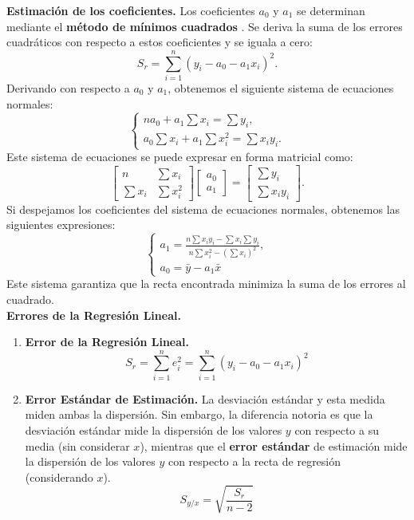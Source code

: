 \documentclass{article}
\begin{document}
\noindent \textbf{Estimación de los coeficientes.}
Los coeficientes $a_0$ y $a_1$ se determinan mediante el \textbf{método de mínimos cuadrados} \cite{polinomico3}. Se deriva la suma de los errores cuadráticos con respecto a estos coeficientes y se iguala a cero:
\begin{equation}
    S_r = \sum_{i=1}^{n} (y_i - a_0 - a_1x_i)^2.
\end{equation}
Derivando con respecto a $a_0$ y $a_1$, obtenemos el siguiente sistema de ecuaciones normales:
\begin{equation}
\begin{cases}
    n a_0 + a_1 \sum x_i = \sum y_i, \\
    a_0 \sum x_i + a_1 \sum x_i^2 = \sum x_i y_i.
\end{cases}
\end{equation}
Este sistema de ecuaciones se puede expresar en forma matricial como:
\[
\begin{bmatrix}
    n & \sum x_i \\
    \sum x_i & \sum x_i^2
\end{bmatrix}
\begin{bmatrix}
    a_0 \\ a_1
\end{bmatrix}
=
\begin{bmatrix}
    \sum y_i \\ \sum x_i y_i
\end{bmatrix}.
\]
Si despejamos los coeficientes del sistema de ecuaciones normales, obtenemos las siguientes expresiones:
$$
\begin{cases}
    a_1 = \frac{n \sum x_i y_i - \sum x_i \sum y_i}{n \sum x_i^2 - (\sum x_i)^2},\\
    a_0 = \bar{y} - a_1 \bar{x}
\end{cases}
$$
Este sistema garantiza que la recta encontrada minimiza la suma de los errores al cuadrado.\\

\noindent\textbf{Errores de la Regresión Lineal.}
\begin{enumerate}
    \item \textbf{Error de la Regresión Lineal.}
    $$
    S_r = \sum_{i=1}^{n} e_i^2 = \sum_{i=1}^{n} (y_i - a_0 - a_1 x_i)^2
    $$
    \item \textbf{Error Estándar de Estimación.} La desviación estándar y esta medida miden ambas la dispersión. Sin embargo, la diferencia notoria es que la desviación estándar mide la dispersión de los valores $y$ con respecto a su media (sin considerar $x$),  mientras que el \textbf{error estándar} de estimación mide la dispersión de los valores $y$ con respecto a la recta de regresión (considerando $x$).
    $$
    S_{y/x} = \sqrt{\frac{S_r}{n-2}}
    $$
\end{enumerate}
\end{document}
